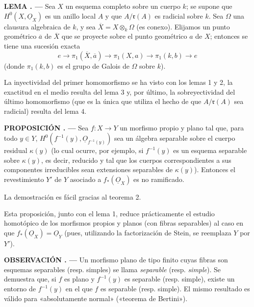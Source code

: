 \documentclass[11pt,twoside,openany]{book}
\numberwithin{equation}{section}
\newcommand{\src}[1]{%
  \phantomsection\hypertarget{src:#1}{}%
  \marginpar{\raggedleft\footnotesize\sffamily #1}%
}
\newcommand{\Osh}{\underline{O}}
\theoremstyle{plain}
\theoremstyle{definition}
\theoremstyle{remark}
\newcommand{\result}[2]{%
  \par\medskip\noindent\textbf{#1%
  \if\relax\detokenize{#2}\relax\else\space#2\fi. ---}\enspace
}
\newcommand{\FgaUnitKey}{frontmatter}
\renewcommand{\src}[1]{%
  \phantomsection\hypertarget{src:\FgaUnitKey:#1}{}%
  \marginpar{\raggedleft\footnotesize\sffamily #1}%
}
\theoremstyle{plain}
\theoremstyle{definition}
\theoremstyle{remark}
\begin{document}
\result{LEMA}{5} Sea $X$ un esquema completo sobre un cuerpo $k$; se supone que
$H^0(X,\Osh_X)$ es un anillo local $A$ y que $A/\mathfrak r(A)$ es radicial
sobre $k$. Sea $\Omega$ una clausura algebraica de $k$, y sea
$\overline X=X\otimes_k\Omega$ (es conexo). Elijamos un punto geométrico
$\overline a$ de $\overline X$ que se proyecte sobre el punto geométrico $a$ de
$X$; entonces se tiene una sucesión exacta
\[
  e\longrightarrow\pi_1(\overline X,\overline a)
  \longrightarrow\pi_1(X,a)
  \longrightarrow\pi_1(k,b)\longrightarrow e
\]
(donde $\pi_1(k,b)$ es el grupo de Galois de $\Omega$ sobre $k$).

La inyectividad del primer homomorfismo se ha visto con los lemas 1 y 2, la
exactitud en el medio resulta del lema 3 y, por último, la sobreyectividad del
último homomorfismo (que es la única que utiliza el hecho de que
$A/\mathfrak r(A)$ sea radicial) resulta del lema 4.

\result{PROPOSICIÓN}{4} Sea $f:X\longrightarrow Y$ un morfismo propio y plano
tal que, para todo $y\in Y$, $H^0(f^{-1}(y),\Osh_{f^{-1}(y)})$ sea un álgebra
separable sobre el cuerpo residual $\kappa(y)$ (lo cual ocurre, por ejemplo, si
$f^{-1}(y)$ es un esquema separable sobre $\kappa(y)$, es decir, reducido y tal
que los cuerpos correspondientes a sus componentes irreducibles sean
extensiones separables de $\kappa(y)$). Entonces el revestimiento $Y'$ de $Y$
asociado a $f_*(\Osh_X)$ es no ramificado.

La demostración es fácil gracias al teorema 2.

\src{213}
Esta proposición, junto con el lema 1, reduce prácticamente el estudio
homotópico de los morfismos propios y planos (con fibras separables) al caso en
que $f_*(\Osh_X)=\Osh_Y$ (pues, utilizando la factorización de Stein, se
reemplaza $Y$ por $Y'$).

\result{OBSERVACIÓN}{} Un morfismo plano de tipo finito cuyas fibras son
esquemas separables (resp. simples) se llama \emph{separable} (resp.
\emph{simple}). Se demuestra que, si $f$ es plano y $f^{-1}(y)$ es separable
(resp. simple), existe un entorno de $f^{-1}(y)$ en el que $f$ es separable
(resp. simple). El mismo resultado es válido para «absolutamente normal»
(«teorema de Bertini»).
\end{document}
